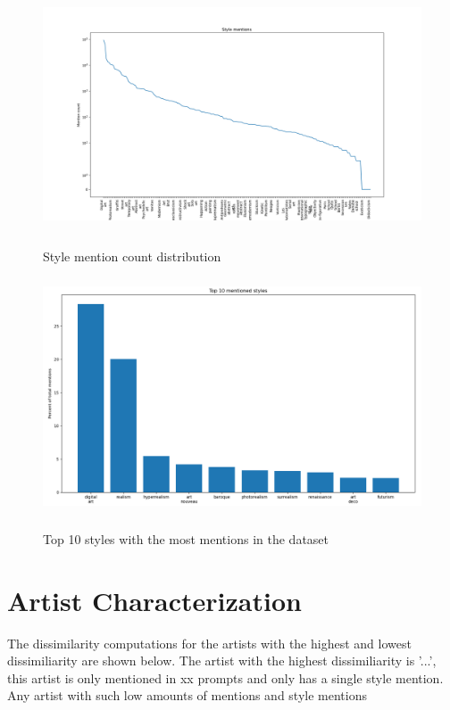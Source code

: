 \begin{figure}[h]
    \begin{center}
        \includegraphics[height=7cm]{Bilder/styles_count_distribution_scale_symlog.png}\\[2.5ex]
    \end{center}
\caption{Style mention count distribution}
\end{figure} %

\begin{figure}[h]
    \begin{center}
        \includegraphics[height=7cm]{Bilder/top10_styles_percentages.png}\\[2.5ex]
    \end{center}
\caption{Top 10 styles with the most mentions in the dataset}
\end{figure} %

\section{Artist Characterization}

The dissimilarity computations for the artists with the highest and lowest dissimiliarity are shown below. The artist with the highest dissimiliarity is '...', this artist is only mentioned in xx prompts and only has a single style mention. Any artist with such low amounts of mentions and style mentions

